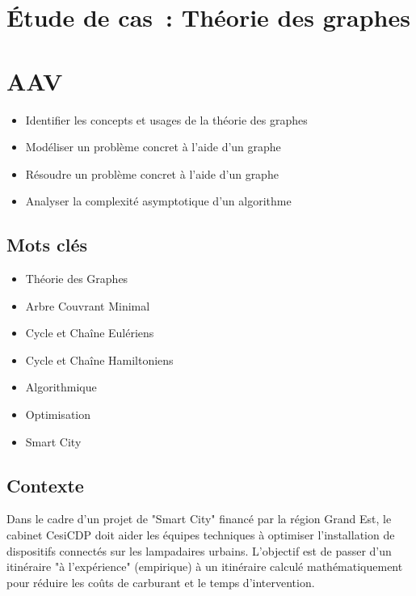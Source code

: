 \newpage
\section*{Étude de cas~: Théorie des graphes}

\section*{AAV}
\begin{itemize}
	\item [1] Identifier les concepts et usages de la théorie des graphes
	\item [3] Modéliser un problème concret à l’aide d’un graphe
	\item [3] Résoudre un problème concret à l’aide d’un graphe
	\item [4] Analyser la complexité asymptotique d'un algorithme
\end{itemize}

\newpage

\subsection*{Mots clés}
{}
\begin{itemize}
	\item Théorie des Graphes
	\item Arbre Couvrant Minimal
	\item Cycle et Chaîne Eulériens
	\item Cycle et Chaîne Hamiltoniens
	\item Algorithmique
	\item Optimisation
	\item Smart City
\end{itemize}

\subsection*{Contexte}
{}
\noindent Dans le cadre d'un projet de "Smart City" financé par la région Grand Est, le cabinet CesiCDP doit aider les équipes techniques à optimiser l'installation de dispositifs connectés sur les lampadaires urbains. L'objectif est de passer d'un itinéraire "à l'expérience" (empirique) à un itinéraire calculé mathématiquement pour réduire les coûts de carburant et le temps d'intervention.

